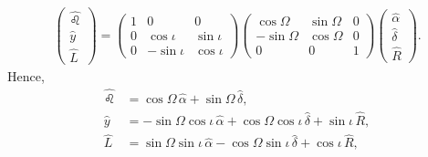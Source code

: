 \documentclass[11pt]{article}
\newcommand{\hatn}{\hat \leo}
\begin{document}
\begin{align}
    \begin{pmatrix} \hatn\\ \hat y\\ \hat L \end{pmatrix} = 
    \begin{pmatrix} 1&0&0\\ 0&\cos\iota&\sin\iota\\ 0&-\sin\iota&\cos\iota \end{pmatrix} \begin{pmatrix} \cos\Omega&\sin\Omega&0\\ -\sin\Omega&\cos\Omega&0\\ 0&0&1 \end{pmatrix} \begin{pmatrix} \hat\alpha\\ \hat\delta\\ \hat R \end{pmatrix}.
\end{align}
Hence,
\begin{align}
\hatn  &= \cos\Omega\,\hat\alpha+\sin\Omega\,\hat\delta, \label{eq:node}\\
\hat y &= -\sin\Omega\cos\iota\,\hat\alpha+\cos\Omega\cos\iota\,\hat\delta+\sin\iota\,\hat R, \label{eq:yhat}\\
\hat L &= \sin\Omega\sin\iota\,\hat\alpha-\cos\Omega\sin\iota\,\hat\delta+\cos\iota\,\hat R, \label{eq:Lhat}
\end{align}
\end{document}
